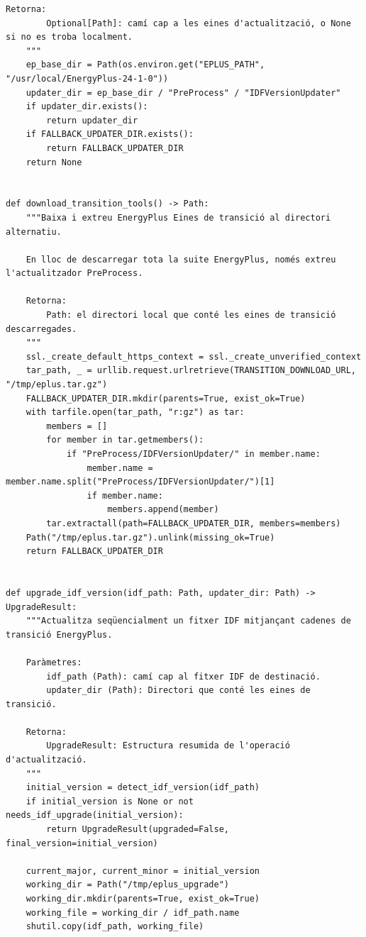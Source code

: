 \documentclass[10pt,a4paper]{article}
\begin{document}
\begin{lstlisting}[style=studioPython,caption={backend/afegir\_entorn\_conversion.py},label={lst:backend-afegir-entorn-conversion-py}]
    Retorna:
        Optional[Path]: camí cap a les eines d'actualització, o None si no es troba localment.
    """
    ep_base_dir = Path(os.environ.get("EPLUS_PATH", "/usr/local/EnergyPlus-24-1-0"))
    updater_dir = ep_base_dir / "PreProcess" / "IDFVersionUpdater"
    if updater_dir.exists():
        return updater_dir
    if FALLBACK_UPDATER_DIR.exists():
        return FALLBACK_UPDATER_DIR
    return None


def download_transition_tools() -> Path:
    """Baixa i extreu EnergyPlus Eines de transició al directori alternatiu.

    En lloc de descarregar tota la suite EnergyPlus, només extreu l'actualitzador PreProcess.

    Retorna:
        Path: el directori local que conté les eines de transició descarregades.
    """
    ssl._create_default_https_context = ssl._create_unverified_context
    tar_path, _ = urllib.request.urlretrieve(TRANSITION_DOWNLOAD_URL, "/tmp/eplus.tar.gz")
    FALLBACK_UPDATER_DIR.mkdir(parents=True, exist_ok=True)
    with tarfile.open(tar_path, "r:gz") as tar:
        members = []
        for member in tar.getmembers():
            if "PreProcess/IDFVersionUpdater/" in member.name:
                member.name = member.name.split("PreProcess/IDFVersionUpdater/")[1]
                if member.name:
                    members.append(member)
        tar.extractall(path=FALLBACK_UPDATER_DIR, members=members)
    Path("/tmp/eplus.tar.gz").unlink(missing_ok=True)
    return FALLBACK_UPDATER_DIR


def upgrade_idf_version(idf_path: Path, updater_dir: Path) -> UpgradeResult:
    """Actualitza seqüencialment un fitxer IDF mitjançant cadenes de transició EnergyPlus.

    Paràmetres:
        idf_path (Path): camí cap al fitxer IDF de destinació.
        updater_dir (Path): Directori que conté les eines de transició.

    Retorna:
        UpgradeResult: Estructura resumida de l'operació d'actualització.
    """
    initial_version = detect_idf_version(idf_path)
    if initial_version is None or not needs_idf_upgrade(initial_version):
        return UpgradeResult(upgraded=False, final_version=initial_version)

    current_major, current_minor = initial_version
    working_dir = Path("/tmp/eplus_upgrade")
    working_dir.mkdir(parents=True, exist_ok=True)
    working_file = working_dir / idf_path.name
    shutil.copy(idf_path, working_file)


\end{lstlisting}
\end{document}
